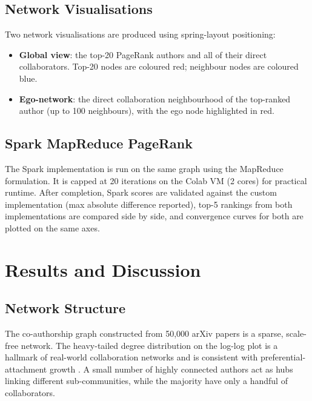 \documentclass[12pt, a4paper]{article}
\begin{document}
\subsection{Network Visualisations}

Two network visualisations are produced using spring-layout positioning:

\begin{itemize}
  \item \textbf{Global view}: the top-20 PageRank authors and all of their direct collaborators. Top-20 nodes are coloured red; neighbour nodes are coloured blue.
  \item \textbf{Ego-network}: the direct collaboration neighbourhood of the top-ranked author (up to 100 neighbours), with the ego node highlighted in red.
\end{itemize}

\subsection{Spark MapReduce PageRank}

The Spark implementation is run on the same graph using the MapReduce formulation. It is capped at 20 iterations on the Colab VM (2 cores) for practical runtime. After completion, Spark scores are validated against the custom implementation (max absolute difference reported), top-5 rankings from both implementations are compared side by side, and convergence curves for both are plotted on the same axes.

\section{Results and Discussion}

\subsection{Network Structure}

The co-authorship graph constructed from 50{,}000 arXiv papers is a sparse, scale-free network. The heavy-tailed degree distribution on the log-log plot is a hallmark of real-world collaboration networks and is consistent with preferential-attachment growth \cite{barabasi1999}. A small number of highly connected authors act as hubs linking different sub-communities, while the majority have only a handful of collaborators.
\end{document}
